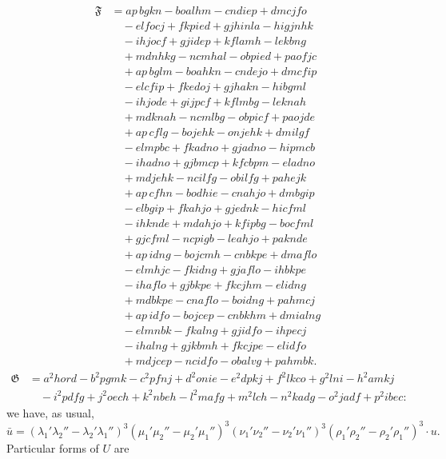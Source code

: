 \documentclass[11pt]{article}
\newcommand{\fF}{\mathfrak{F}}
\newcommand{\fG}{\mathfrak{G}}
\begin{document}
{\small
\[
\begin{aligned}
\fF &= ap\,bgkn - boalhm - cndiep + dmcjfo\\
&\quad - elfocj + fkpied + gjhinla - higjnhk\\
&\quad - ihjocf + gjidep + kflamh - lekbng\\
&\quad + mdnhkg - ncmhal - obpied + paofjc\\
&\quad + ap\,bglm - boahkn - cndejo + dmcfip\\
&\quad - elcfip + fkedoj + gjhakn - hibgml\\
&\quad - ihjode + gijpcf + kflmbg - leknah\\
&\quad + mdknah - ncmlbg - obpicf + paojde\\
&\quad + ap\,cflg - bojehk - onjehk + dmilgf\\
&\quad - elmpbc + fkadno + gjadno - hipmcb\\
&\quad - ihadno + gjbmcp + kfcbpm - eladno\\
&\quad + mdjehk - ncilfg - obilfg + pahejk\\
&\quad + ap\,cfhn - bodhie - cnahjo + dmbgip\\
&\quad - elbgip + fkahjo + gjednk - hicfml\\
&\quad - ihknde + mdahjo + kfipbg - bocfml\\
&\quad + gjcfml - ncpigb - leahjo + paknde\\
&\quad + ap\,idng - bojcmh - cnbkpe + dmaflo\\
&\quad - elmhjc - fkidng + gjaflo - ihbkpe\\
&\quad - ihaflo + gjbkpe + fkcjhm - elidng\\
&\quad + mdbkpe - cnaflo - boidng + pahmcj\\
&\quad + ap\,idfo - bojcep - cnbkhm + dmialng\\
&\quad - elmnbk - fkalng + gjidfo - ihpecj\\
&\quad - ihalng + gjkbmh + fkcjpe - elidfo\\
&\quad + mdjcep - ncidfo - obalvg + pahmbk.
\end{aligned}
\]
}
\[
\begin{aligned}
\fG &= a^2 hord - b^2 pgmk - c^2 pfnj + d^2 onie - e^2 dpkj + f^2 lkco + g^2 lni - h^2 amkj\\
&\quad - i^2 pdfg + j^2 oech + k^2 nbeh - l^2 mafg + m^2 lch - n^2 kadg - o^2 jadf + p^2 ibec :
\end{aligned}
\]
we have, as usual,
\[
\bar{u} = (\lambda_1'\lambda_2'' - \lambda_2'\lambda_1'')^3(\mu_1'\mu_2'' - \mu_2'\mu_1'')^3(\nu_1'\nu_2'' - \nu_2'\nu_1'')^3(\rho_1'\rho_2'' - \rho_2'\rho_1'')^3\cdot u.
\]
Particular forms of $U$ are
\smallskip
\end{document}
